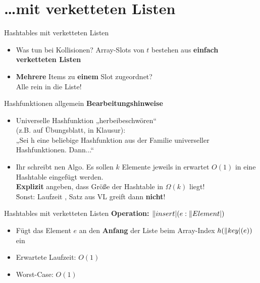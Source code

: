 \section{\dots mit verketteten Listen}

\begin{frame}{Hashtables mit verketteten Listen}
	\begin{itemize}
		\item Was tun bei Kollisionen?
		\pause
		\implitem Array-Slots von $t$ bestehen aus \textbf{einfach verketteten Listen} \pause
		\item \textbf{Mehrere} Items zu \textbf{einem} Slot zugeordnet? \\
		Alle rein in die Liste!
	\end{itemize}
\end{frame}

\begin{frame}{Hashfunktionen allgemein}
	\textbf{Bearbeitungshinweise}
	\begin{itemize}
		\item Universelle Hashfunktion „herbeibeschwören“ \\
		{\small (z.B. auf Übungsblatt, in Klausur)}: \\
		„Sei h eine beliebige Hashfunktion aus der Familie universeller Hashfunktionen. Dann...“ 
		\item Ihr schreibt nen Algo. Es sollen $k$ Elemente jeweils in erwartet $O(1)$ in eine Hashtable eingefügt werden. \\
		\§{\impl} \textbf{Explizit} angeben, dass Größe der Hashtable in $\Omega(k)$ liegt! \\
		\. Sonst: Laufzeit , Satz aus VL greift dann \textbf{nicht}!
	\end{itemize}
\end{frame}


\begin{frame}{Hashtables mit verketteten Listen}
	\textbf{Operation: $\|insert|(e : \|Element|)$} \\[0,125cm]
	\begin{itemize}
		\item Fügt das Element $e$ an den \textbf{Anfang} der Liste beim Array-Index $h(\|key|(e))$ ein
		\pause
		\item Erwartete Laufzeit: $O(1)$
		\item Worst-Case: $O(1)$
	\end{itemize}
\end{frame}

